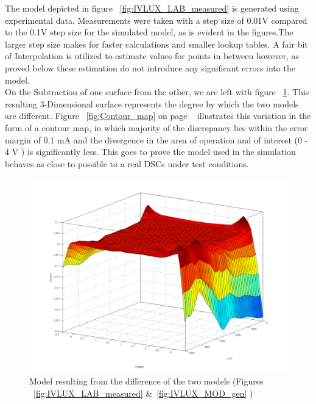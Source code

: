 The model depicted in figure ~\ref{fig:IVLUX_LAB_measured} is generated using experimental data. Measurements were taken with a step size of 0.01V compared to the 0.1V step size for the simulated model, as is evident in the figures.The larger step size makes for faster calculations and smaller lookup tables. A fair bit of Interpolation is utilized to estimate values for points in between however, as proved below these estimation do not introduce any significant errors into the model.\\

On the Subtraction of one surface from the other, we are left with figure ~\ref{fig:Diff_Contour}. This resulting 3-Dimensional surface represents the degree by which the two models are different. Figure ~\ref{fig:Contour_map} on page ~\pageref{fig:Contour_map} illustrates this variation in the form of a contour map, in which majority of the discrepancy lies within the error margin of 0.1 mA and the divergence in the area of operation and of interest (0 - 4 V ) is significantly less. This goes to prove the model used in the simulation behaves as close to possible to a real \ac{DSCs} under test conditions.                      


\begin{figure}[H]
  \begin{center}
	  \includegraphics[width=\textwidth]{images/Diff_Contour}
	  \caption{Model resulting from the difference of the two models (Figures ~\ref{fig:IVLUX_LAB_measured} \&~\ref{fig:IVLUX_MOD_gen} )}
	  \label{fig:Diff_Contour}
  \end{center}
\end{figure}


